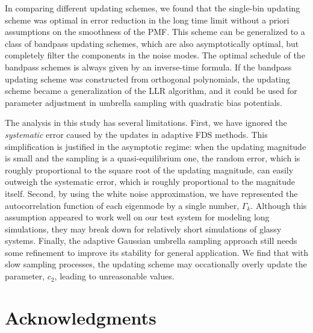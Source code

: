 \documentclass[reprint, superscriptaddress, floatfix]{revtex4-1}
\begin{document}
In comparing different updating schemes,
we found that
the single-bin updating scheme was optimal
in error reduction
in the long time limit
without a priori assumptions
on the smoothness of the PMF.
%
This scheme can be generalized to
a class of bandpass updating schemes,
which are also asymptotically optimal,
but completely filter the components
in the noise modes.
%
The optimal schedule of the bandpass schemes
is always given by an inverse-time formula.
%
If the bandpass updating scheme was constructed
from orthogonal polynomials,
the updating scheme became a generalization
of the LLR algorithm\cite{langfeld2012, *pellegrini2014},
and it could be used for parameter adjustment
in umbrella sampling with quadratic
bias potentials\cite{neuhaus2006, *neuhaus2007, zhu2012}.



The analysis in this study has several limitations.
%
First, we have ignored the \emph{systematic}
error\cite{zhou2005, morozov2007, zhou2008}
caused by the updates in adaptive FDS methods.
%
This simplification is justified in the asymptotic regime:
when the updating magnitude is small
and the sampling is a quasi-equilibrium one\cite{
  zhou2005, morozov2007, zhou2008, barducci2008, dama2014},
the random error,
which is roughly proportional to
the square root of the updating magnitude\cite{
  zhou2005, morozov2007, zhou2008, bussi2006},
can easily outweigh
the systematic error,
which is roughly proportional to
the magnitude itself\cite{morozov2007}.
%
%
Second, by using the white noise approximation,
we have represented the autocorrelation function
of each eigenmode by a single number, $\Gamma_k$.
%
Although this assumption appeared to work well
on our test system for modeling long simulations,
they may break down for relatively short simulations
of glassy systems.
%
Finally, the adaptive Gaussian umbrella sampling
approach still needs some refinement to improve
its stability for general application.
%
We find that with slow sampling processes,
the updating scheme may occationally overly update
the parameter, $c_2$, leading to unreasonable values.


\section{Acknowledgments}
\end{document}

